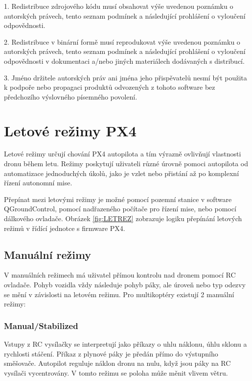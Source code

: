 1. Redistribuce zdrojového kódu musí obsahovat výše uvedenou poznámku o autorských právech, tento seznam podmínek a následující prohlášení o vyloučení odpovědnosti.

2. Redistribuce v binární formě musí reprodukovat výše uvedenou poznámku o autorských právech, tento seznam podmínek a následující prohlášení o vyloučení odpovědnosti v dokumentaci a/nebo jiných materiálech dodávaných s distribucí.

3. Jméno držitele autorských práv ani jména jeho přispěvatelů nesmí být použita k podpoře nebo propagaci produktů odvozených z tohoto software bez předchozího výslovného písemného povolení.

\section{Letové režimy PX4}

Letové režimy určují chování PX4 autopilota a tím výrazně ovlivňují vlastnosti dronu během letu. Režimy poskytují uživateli různé úrovně pomoci autopilota od automatizace jednoduchých úkolů, jako je vzlet nebo přistání až po komplexní řízení autonomní mise.

Přepínat mezi letovými režimy je možné pomocí pozemní stanice v software QGroundControl, pomocí nadřazeného počítače pro řízení mise, nebo pomocí dálkového ovladače. Obrázek \ref{fig:LETREZ} zobrazuje logiku přepínání letových režimů v řídící jednotce s firmware PX4. \cite{PX4docs}

\subsection{Manuální režimy}

V manuálních režimech má uživatel přímou kontrolu nad dronem pomocí RC ovladače. Pohyb vozidla vždy následuje pohyb páky, ale úroveň nebo typ odezvy se mění v závislosti na letovém režimu. Pro multikoptéry existují 2 manuální režimy:

\subsubsection{Manual/Stabilized}

Vstupy z RC vysílačky se interpretují jako příkazy o uhlu náklonu, úhlu sklonu a rychlosti stáčení. Příkaz z plynové páky je předán přímo do výstupního směšovače. Autopilot reguluje náklon dronu na nulu, když jsou páky na RC vysílači vycentrovány. V tomto režimu se poloha může měnit vlivem větru.

